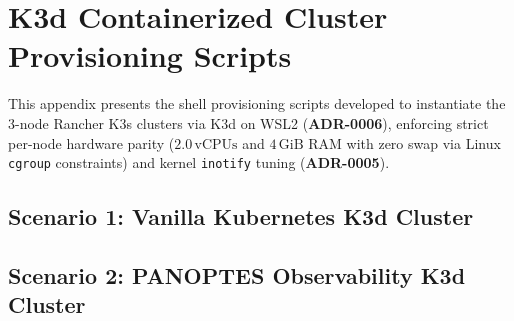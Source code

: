 \chapter{K3d Containerized Cluster Provisioning Scripts}
\label{app:k3d-scripts}
\label{appendix:a}
\label{appendix:c}

This appendix presents the shell provisioning scripts developed to instantiate the 3-node Rancher K3s clusters via K3d on WSL2 (\textbf{ADR-0006}), enforcing strict per-node hardware parity ($2.0\,\text{vCPUs}$ and $4\,\text{GiB}$ RAM with zero swap via Linux \texttt{cgroup} constraints) and kernel \texttt{inotify} tuning (\textbf{ADR-0005}).

\section{Scenario 1: Vanilla Kubernetes K3d Cluster}
\label{app:shell-vanilla}



\section{Scenario 2: PANOPTES Observability K3d Cluster}
\label{app:shell-panoptes}


